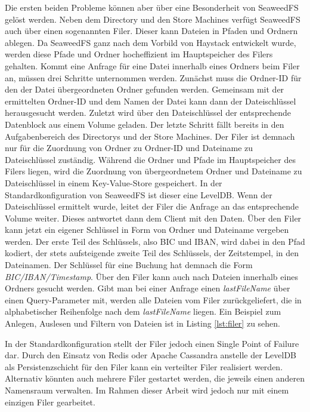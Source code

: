 \documentclass[12pt,oneside,a4paper,parskip]{scrbook}
\begin{document}
Die ersten beiden Probleme können aber über eine Besonderheit von SeaweedFS gelöst werden. Neben dem Directory und den Store Machines verfügt SeaweedFS auch über einen sogenannten Filer. Dieser kann Dateien in Pfaden und Ordnern ablegen. Da SeaweedFS ganz nach dem Vorbild von Haystack entwickelt wurde, werden diese Pfade und Ordner hocheffizient im Hauptspeicher des Filers gehalten. Kommt eine Anfrage für eine Datei innerhalb eines Ordners beim Filer an, müssen drei Schritte unternommen werden. Zunächst muss die Ordner-ID für den der Datei übergeordneten Ordner gefunden werden. Gemeinsam mit der ermittelten Ordner-ID und dem Namen der Datei kann dann der Dateischlüssel herausgesucht werden. Zuletzt wird über den Dateischlüssel der entsprechende Datenblock aus einem Volume geladen. Der letzte Schritt fällt bereits in den Aufgabenbereich des Directorys und der Store Machines. Der Filer ist demnach nur für die Zuordnung von Ordner zu Ordner-ID und Dateiname zu Dateischlüssel zuständig. Während die Ordner und Pfade im Hauptspeicher des Filers liegen, wird die Zuordnung von übergeordnetem Ordner und Dateiname zu Dateischlüssel in einem Key-Value-Store gespeichert. In der Standardkonfiguration von SeaweedFS ist dieser eine LevelDB. Wenn der Dateischlüssel ermittelt wurde, leitet der Filer die Anfrage an das entsprechende Volume weiter. Dieses antwortet dann dem Client mit den Daten.
Über den Filer kann jetzt ein eigener Schlüssel in Form von Ordner und Dateiname vergeben werden. Der erste Teil des Schlüssels, also BIC und IBAN, wird dabei in den Pfad kodiert, der stets aufsteigende  zweite Teil des Schlüssels, der Zeitstempel, in den Dateinamen. Der Schlüssel für eine Buchung hat demnach die Form \textit{{BIC}/{IBAN}/{Timestamp}}. Über den Filer kann auch nach Dateien innerhalb eines Ordners gesucht werden. Gibt man bei einer Anfrage einen \textit{lastFileName} über einen Query-Parameter mit, werden alle Dateien vom Filer zurückgeliefert, die in alphabetischer Reihenfolge nach dem \textit{lastFileName} liegen. Ein Beispiel zum Anlegen, Auslesen und Filtern von Dateien ist in Listing \ref{lst:filer} zu sehen.

In der Standardkonfiguration stellt der Filer jedoch einen Single Point of Failure dar. Durch den Einsatz von Redis oder Apache Cassandra anstelle der LevelDB als Persistenzschicht für den Filer kann ein verteilter Filer realisiert werden. Alternativ könnten auch mehrere Filer gestartet werden, die jeweils einen anderen Namensraum verwalten. Im Rahmen dieser Arbeit wird jedoch nur mit einem einzigen Filer gearbeitet.
\end{document}

